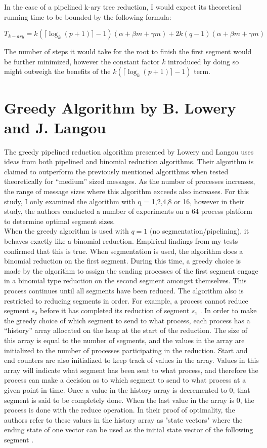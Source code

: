 \documentclass{article}
\begin{document}
\noindent In the case of a pipelined k-ary tree reduction, I would expect its theoretical running time 
to be bounded by the following formula:

$$T_{k-ary} = k(\lceil \log_k{(p+1)} \rceil - 1)(\alpha + \beta m + \gamma m) +
2k(q-1)(\alpha + \beta m + \gamma m)$$

\noindent The number of steps it would take for the root to finish the first segment would be 
further minimized, however the constant factor $k$ introduced by doing so might outweigh the benefits of the $k(\lceil \log_k{(p+1)} \rceil - 1)$ term.

\section{Greedy Algorithm by B. Lowery and J. Langou}

The greedy pipelined reduction algorithm presented by Lowery and Langou \cite{Lowery-13} uses ideas from
both pipelined and binomial reduction algorithms. Their algorithm is claimed to outperform the
previously mentioned algorithms when tested theoretically for “medium” sized messages. As the number
of processes increases, the range of message sizes where this algorithm exceeds also increases. For this
study, I only examined the algorithm with q = 1,2,4,8 or 16, however in their study, the authors conducted
a number of experiments on a 64 process platform to determine optimal segment sizes. \\

When the greedy algorithm is used with $q = 1$ (no segmentation/pipelining), it behaves exactly
like a binomial reduction. Empirical findings from my tests confirmed that this is true. When
segmentation is used, the algorithm does a binomial reduction on the first segment. During this time, a
greedy choice is made by the algorithm to assign the sending processes of the first segment engage in a
binomial type reduction on the second segment amongst themselves. This process continues until all
segments have been reduced. The algorithm also is restricted to reducing segments in order. For example,
a process cannot reduce segment $s_2$ before it has completed its reduction of segment $s_1$ . In order to make
the greedy choice of which segment to send to what process, each process has a “history” array allocated
on the heap at the start of the reduction. The size of this array is equal to the number of segments, and the
values in the array are initialized to the number of processes participating in the reduction. Start and end
counters are also initialized to keep track of values in the array. Values in this array will indicate what
segment has been sent to what process, and therefore the process can make a decision as to which
segment to send to what process at a given point in time. Once a value in the history array is decremented
to 0, that segment is said to be completely done. When the last value in the array is 0, the process is done
with the reduce operation. In their proof of optimality, the authors refer to these values in the history
array as "state vectors" where the ending state of one vector can be used as the initial state vector of the 
following segment \cite{Lowery-13}. \\
\end{document}
